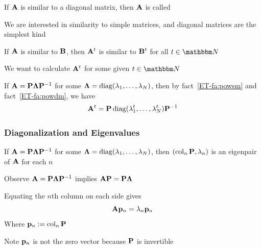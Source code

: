\begin{frame}
   
    \vspace{2em}
    If $\mathbf A$ is similar to a diagonal matrix, then $\mathbf A$ is
    called 
    
    \vspace{.7em}
    We are interested in similarity to simple matrices, and diagonal matrices are the simplest kind 
    
\end{frame}

\begin{frame}

     \vspace{2em}
    \Fact{\eqref{ET-fa:powsm}}
        If $\mathbf A$ is similar to $\mathbf B$, then $\mathbf A^t$ is similar to
        $\mathbf B^t$ for all $t \in \NN$
    
    \vspace{.7em}
    \Eg
    We want to calculate $\mathbf A^t$ for some given $t \in \NN$ 
    
    If $\mathbf A = \mathbf P {\boldsymbol \Lambda} \mathbf P^{-1}$ for some
    ${\boldsymbol \Lambda} = \operatorname{diag}(\lambda_1, \ldots, \lambda_N)$, then by
    fact~\ref{ET-fa:powsm} and fact~\ref{ET-fa:powdm}, we
    have
        $$\mathbf A^t = \mathbf P \operatorname{diag}(\lambda_1^t, \ldots, \lambda_N^t)
        \mathbf P^{-1}$$
    
\end{frame}

\begin{frame}\frametitle{Diagonalization and Eigenvalues}

    \vspace{.7em}
    \Fact{\eqref{ET-fa:diagee}}
    If $\mathbf A = \mathbf P {\boldsymbol \Lambda} \mathbf P^{-1}$ for some ${\boldsymbol \Lambda} =
        \operatorname{diag}(\lambda_1, \ldots, \lambda_N)$, then $(\operatorname{col}_n \mathbf P,
            \lambda_n)$ is an eigenpair of $\mathbf A$ for each $n$
            
    \vspace{.7em}    
    
    \Prf
    Observe $\mathbf A
    = \mathbf P {\boldsymbol \Lambda} \mathbf P^{-1}$ implies $\mathbf A \mathbf P = \mathbf P {\boldsymbol \Lambda}$
    
    Equating the $n$th column on each side gives 
        $$\mathbf A {\mathbf p}_n = \lambda_n
        {\mathbf p}_n$$
    Where ${\mathbf p}_n := \operatorname{col}_n \mathbf P$
    
    Note  ${\mathbf p}_n$ is not the
    zero vector because $\mathbf P$ is invertible
        
\end{frame}

